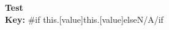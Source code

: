 \documentclass{article}
\begin{document}
\begin{minipage}{0.7\textwidth}
    \begin{flushright}
        \textbf{\LARGE Test}\\
        \textbf{Key:} {{#if this.[value]}}{{this.[value]}}{{else}}N/A{{/if}}\\
    \end{flushright}
\end{minipage}
\end{document}

